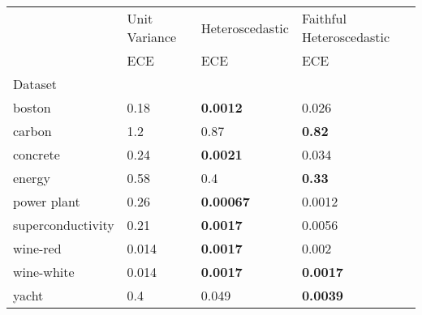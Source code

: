 \begin{tabular}{l|l|l|l}
\toprule
 & Unit Variance & Heteroscedastic & Faithful Heteroscedastic \\
 & ECE & ECE & ECE \\
Dataset &  &  &  \\
\midrule
boston & 0.18 & \bfseries 0.0012 & 0.026 \\
carbon & 1.2 & 0.87 & \bfseries 0.82 \\
concrete & 0.24 & \bfseries 0.0021 & 0.034 \\
energy & 0.58 & 0.4 & \bfseries 0.33 \\
power plant & 0.26 & \bfseries 0.00067 & 0.0012 \\
superconductivity & 0.21 & \bfseries 0.0017 & 0.0056 \\
wine-red & 0.014 & \bfseries 0.0017 & 0.002 \\
wine-white & 0.014 & \bfseries 0.0017 & \bfseries 0.0017 \\
yacht & 0.4 & 0.049 & \bfseries 0.0039 \\
\bottomrule
\end{tabular}
